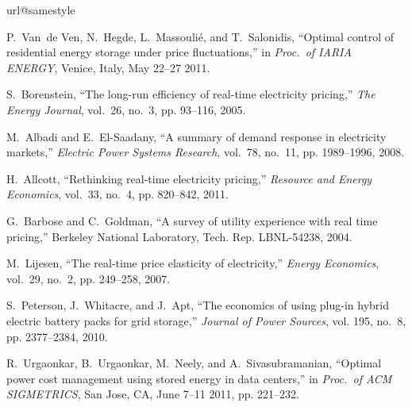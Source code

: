 \documentclass[journal]{IEEEtran}
\newcommand\1{\mathbf{1}}
\begin{document}
\begin{thebibliography}{10}
\providecommand{\url}[1]{#1}
\csname url@samestyle\endcsname
\providecommand{\newblock}{\relax}
\providecommand{\bibinfo}[2]{#2}
\providecommand{\BIBentrySTDinterwordspacing}{\spaceskip=0pt\relax}
\providecommand{\BIBentryALTinterwordstretchfactor}{4}
\providecommand{\BIBentryALTinterwordspacing}{\spaceskip=\fontdimen2\font plus
\BIBentryALTinterwordstretchfactor\fontdimen3\font minus
  \fontdimen4\font\relax}
\providecommand{\BIBforeignlanguage}[2]{{\expandafter\ifx\csname l@#1\endcsname\relax
\typeout{** WARNING: IEEEtran.bst: No hyphenation pattern has been}\typeout{** loaded for the language `#1'. Using the pattern for}\typeout{** the default language instead.}\else
\language=\csname l@#1\endcsname
\fi
#2}}
\providecommand{\BIBdecl}{\relax}
\BIBdecl

P.~Van~de Ven, N.~Hegde, L.~Massouli\'e, and T.~Salonidis, ``Optimal control of
  residential energy storage under price fluctuations,'' in \emph{Proc.\ of
  {IARIA} {ENERGY}}, Venice, Italy, May 22--27 2011.

S.~Borenstein, ``The long-run efficiency of real-time electricity pricing,''
  \emph{The Energy Journal}, vol.~26, no.~3, pp. 93--116, 2005.

M.~Albadi and E.~El-Saadany, ``A summary of demand response in electricity
  markets,'' \emph{Electric Power Systems Research}, vol.~78, no.~11, pp.
  1989--1996, 2008.

H.~Allcott, ``Rethinking real-time electricity pricing,'' \emph{Resource and
  Energy Economics}, vol.~33, no.~4, pp. 820--842, 2011.

G.~Barbose and C.~Goldman, ``A survey of utility experience with real time
  pricing,'' Berkeley National Laboratory, Tech. Rep. LBNL-54238, 2004.

M.~Lijesen, ``The real-time price elasticity of electricity,'' \emph{Energy
  Economics}, vol.~29, no.~2, pp. 249--258, 2007.

S.~Peterson, J.~Whitacre, and J.~Apt, ``The economics of using plug-in hybrid
  electric battery packs for grid storage,'' \emph{Journal of Power Sources},
  vol. 195, no.~8, pp. 2377--2384, 2010.

R.~Urgaonkar, B.~Urgaonkar, M.~Neely, and A.~Sivasubramanian, ``Optimal power
  cost management using stored energy in data centers,'' in \emph{Proc.\ of
  {ACM} {SIGMETRICS}}, San Jose, CA, June 7--11 2011, pp. 221--232.


\end{thebibliography}
\end{document}
